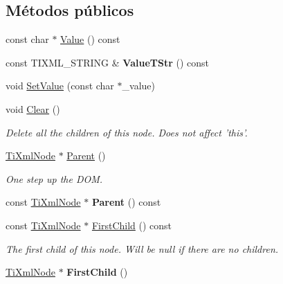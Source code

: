 \subsection*{\-Métodos públicos}
\begin{DoxyCompactItemize}
\item 
const char $\ast$ \hyperlink{classTiXmlNode_a77943eb90d12c2892b1337a9f5918b41}{\-Value} () const 
\item 
\hypertarget{classTiXmlNode_a83ece13d2ea66dac66e0b21332229239}{const \-T\-I\-X\-M\-L\-\_\-\-S\-T\-R\-I\-N\-G \& {\bfseries \-Value\-T\-Str} () const }\label{classTiXmlNode_a83ece13d2ea66dac66e0b21332229239}

\item 
void \hyperlink{classTiXmlNode_a2a38329ca5d3f28f98ce932b8299ae90}{\-Set\-Value} (const char $\ast$\-\_\-value)
\item 
\hypertarget{classTiXmlNode_a708e7f953df61d4d2d12f73171550a4b}{void \hyperlink{classTiXmlNode_a708e7f953df61d4d2d12f73171550a4b}{\-Clear} ()}\label{classTiXmlNode_a708e7f953df61d4d2d12f73171550a4b}

\begin{DoxyCompactList}\small\item\em \-Delete all the children of this node. \-Does not affect 'this'. \end{DoxyCompactList}\item 
\hypertarget{classTiXmlNode_ab643043132ffd794f8602685d34a982e}{\hyperlink{classTiXmlNode}{\-Ti\-Xml\-Node} $\ast$ \hyperlink{classTiXmlNode_ab643043132ffd794f8602685d34a982e}{\-Parent} ()}\label{classTiXmlNode_ab643043132ffd794f8602685d34a982e}

\begin{DoxyCompactList}\small\item\em \-One step up the \-D\-O\-M. \end{DoxyCompactList}\item 
\hypertarget{classTiXmlNode_a78878709e53066f06eb4fcbcdd3a5260}{const \hyperlink{classTiXmlNode}{\-Ti\-Xml\-Node} $\ast$ {\bfseries \-Parent} () const }\label{classTiXmlNode_a78878709e53066f06eb4fcbcdd3a5260}

\item 
\hypertarget{classTiXmlNode_a44c8eee26bbe2d1b2762038df9dde2f0}{const \hyperlink{classTiXmlNode}{\-Ti\-Xml\-Node} $\ast$ \hyperlink{classTiXmlNode_a44c8eee26bbe2d1b2762038df9dde2f0}{\-First\-Child} () const }\label{classTiXmlNode_a44c8eee26bbe2d1b2762038df9dde2f0}

\begin{DoxyCompactList}\small\item\em \-The first child of this node. \-Will be null if there are no children. \end{DoxyCompactList}\item 
\hypertarget{classTiXmlNode_a5e97d69b7c0ebd27fb7286be56559b77}{\hyperlink{classTiXmlNode}{\-Ti\-Xml\-Node} $\ast$ {\bfseries \-First\-Child} ()}\label{classTiXmlNode_a5e97d69b7c0ebd27fb7286be56559b77}


\end{DoxyCompactItemize}
